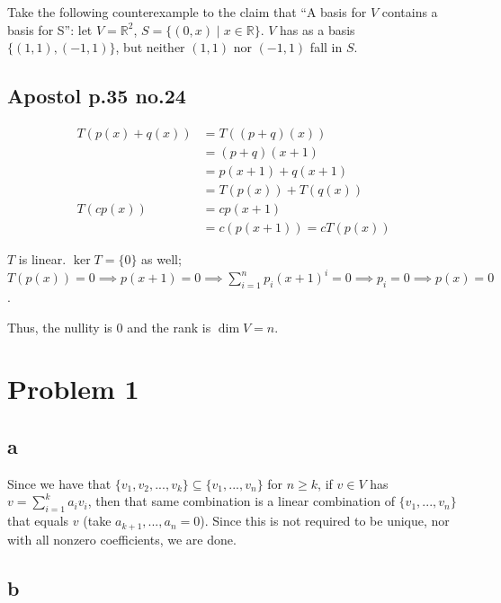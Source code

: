 \documentclass[12pt,letterpaper]{article}
\theoremstyle{definition}
\newcommand{\R}{\mathbb{R}}
\begin{document}
Take the following counterexample to the claim that ``A basis for $V$ contains
a basis for S'': let $V = \R^2$, $S = \{(0, x) \mid x \in \R\}$. $V$ has as a
basis $\{(1, 1), (-1, 1)\}$, but neither $(1,1)$ nor $(-1, 1)$ fall in $S$.

\subsection*{Apostol p.35 no.24}


\begin{align*}
  T(p(x) + q(x)) &= T((p + q)(x)) \\
                 &= (p + q)(x + 1) \\
                 &= p(x + 1) + q(x + 1) \\
                 &= T(p(x)) + T(q(x)) \\
  T(cp(x)) &= cp(x + 1) \\
                 &= c(p(x + 1)) = cT(p(x))
\end{align*}

$T$ is linear. $\ker T = \{0\}$ as well; $T(p(x)) = 0 \implies p(x + 1) = 0
\implies \sum_{i=1}^np_i(x + 1)^i = 0 \implies p_i = 0 \implies p(x) = 0$.

Thus, the nullity is 0 and the rank is $\dim V = n$.

\section*{Problem 1}

\subsection*{a}

Since we have that $\{v_1, v_2, ..., v_k\} \subseteq \{v_1, ..., v_n\}$ for $n
\geq k$, if $v \in V$ has $v = \sum_{i=1}^ka_iv_i$, then that same combination
is a linear combination of $\{v_1, ..., v_n\}$ that equals $v$ (take $a_{k+1},
..., a_n = 0$). Since this is not required to be unique, nor with all nonzero
coefficients, we are done. 

\subsection*{b}
\end{document}
